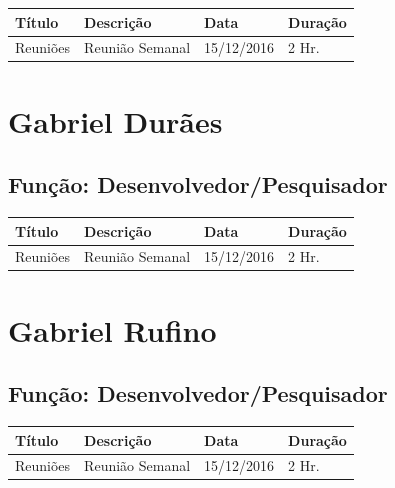 \documentclass[a4paper, 12pt]{article}
\newcommand\datareuniao{15/12/2016}
\begin{document}
\begin{tabularx}{\linewidth}{l|X|l|l} \toprule
    \bfseries Título & \bfseries Descrição & \bfseries Data & \bfseries Duração
    \\ \midrule
    Reuniões & Reunião Semanal & \datareuniao & 2 Hr.
    \\ \bottomrule
\end{tabularx}



\section*{Gabriel Durães}
\subsection*{Função: Desenvolvedor/Pesquisador}

\begin{tabularx}{\linewidth}{l|X|l|l} \toprule
	\bfseries Título & \bfseries Descrição & \bfseries Data & \bfseries Duração
	\\ \midrule
	Reuniões & Reunião Semanal & \datareuniao & 2 Hr.
	\\ \bottomrule
\end{tabularx}



\section*{Gabriel Rufino}
\subsection*{Função: Desenvolvedor/Pesquisador}

\begin{tabularx}{\linewidth}{l|X|l|l} \toprule
    \bfseries Título & \bfseries Descrição & \bfseries Data & \bfseries Duração
    \\ \midrule
    Reuniões & Reunião Semanal & \datareuniao & 2 Hr.
    \\ \bottomrule
\end{tabularx}
\end{document}
